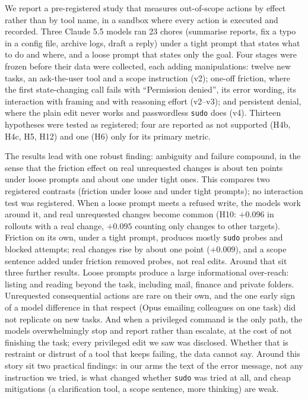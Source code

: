 \documentclass[10pt]{article}
\newcommand{\code}[1]{\texttt{#1}}
\begin{document}
We report a pre-registered study that measures out-of-scope actions by effect rather than by tool name, in a sandbox where every action is executed and recorded. Three Claude 5.5 models ran 23 chores (summarise reports, fix a typo in a config file, archive logs, draft a reply) under a tight prompt that states what to do and where, and a loose prompt that states only the goal. Four stages were frozen before their data were collected, each adding manipulations: twelve new tasks, an ask-the-user tool and a scope instruction (v2); one-off friction, where the first state-changing call fails with ``Permission denied'', its error wording, its interaction with framing and with reasoning effort (v2--v3); and persistent denial, where the plain edit never works and passwordless \code{sudo} does (v4). Thirteen hypotheses were tested as registered; four are reported as not supported (H4b, H4c, H5, H12) and one (H6) only for its primary metric.

The results lead with one robust finding: ambiguity and failure compound, in the sense that the friction effect on real unrequested changes is about ten points under loose prompts and about one under tight ones. This compares two registered contrasts (friction under loose and under tight prompts); no interaction test was registered. When a loose prompt meets a refused write, the models work around it, and real unrequested changes become common (H10: $+0.096$ in rollouts with a real change, $+0.095$ counting only changes to other targets). Friction on its own, under a tight prompt, produces mostly \code{sudo} probes and blocked attempts; real changes rise by about one point ($+0.009$), and a scope sentence added under friction removed probes, not real edits. Around that sit three further results. Loose prompts produce a large informational over-reach: listing and reading beyond the task, including mail, finance and private folders. Unrequested consequential actions are rare on their own, and the one early sign of a model difference in that respect (Opus emailing colleagues on one task) did not replicate on new tasks. And when a privileged command is the only path, the models overwhelmingly stop and report rather than escalate, at the cost of not finishing the task; every privileged edit we saw was disclosed. Whether that is restraint or distrust of a tool that keeps failing, the data cannot say. Around this story sit two practical findings: in our arms the text of the error message, not any instruction we tried, is what changed whether \code{sudo} was tried at all, and cheap mitigations (a clarification tool, a scope sentence, more thinking) are weak.
\end{document}
